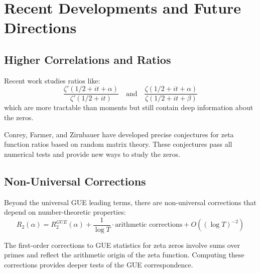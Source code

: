 \section{Recent Developments and Future Directions}
\label{sec:recent_developments}

\subsection{Higher Correlations and Ratios}

\begin{definition}
Recent work studies ratios like:
\begin{equation}
\frac{\zeta'(1/2 + it + \alpha)}{\zeta'(1/2 + it)} \quad \text{and} \quad \frac{\zeta(1/2 + it + \alpha)}{\zeta(1/2 + it + \beta)}
\end{equation}
which are more tractable than moments but still contain deep information about the zeros.
\end{definition}

\begin{theorem}
\label{thm:ratio_conjectures}
Conrey, Farmer, and Zirnbauer have developed precise conjectures for zeta function ratios based on random matrix theory. These conjectures pass all numerical tests and provide new ways to study the zeros.
\end{theorem}

\subsection{Non-Universal Corrections}

\begin{definition}
Beyond the universal GUE leading terms, there are non-universal corrections that depend on number-theoretic properties:
\begin{equation}
R_2(\alpha) = R_2^{GUE}(\alpha) + \frac{1}{\log T} \cdot \text{arithmetic corrections} + O((\log T)^{-2})
\end{equation}
\end{definition}

\begin{theorem}
\label{thm:arithmetic_corrections}
The first-order corrections to GUE statistics for zeta zeros involve sums over primes and reflect the arithmetic origin of the zeta function. Computing these corrections provides deeper tests of the GUE correspondence.
\end{theorem}

